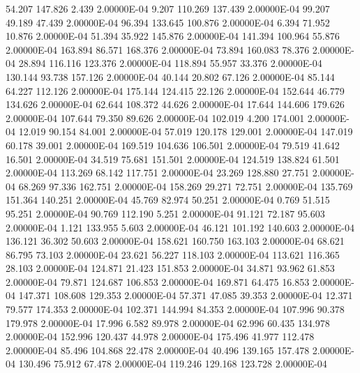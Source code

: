     54.207   147.826     2.439  2.00000E-04
     9.207   110.269   137.439  2.00000E-04
    99.207    49.189    47.439  2.00000E-04
    96.394   133.645   100.876  2.00000E-04
     6.394    71.952    10.876  2.00000E-04
    51.394    35.922   145.876  2.00000E-04
   141.394   100.964    55.876  2.00000E-04
   163.894    86.571   168.376  2.00000E-04
    73.894   160.083    78.376  2.00000E-04
    28.894   116.116   123.376  2.00000E-04
   118.894    55.957    33.376  2.00000E-04
   130.144    93.738   157.126  2.00000E-04
    40.144    20.802    67.126  2.00000E-04
    85.144    64.227   112.126  2.00000E-04
   175.144   124.415    22.126  2.00000E-04
   152.644    46.779   134.626  2.00000E-04
    62.644   108.372    44.626  2.00000E-04
    17.644   144.606   179.626  2.00000E-04
   107.644    79.350    89.626  2.00000E-04
   102.019     4.200   174.001  2.00000E-04
    12.019    90.154    84.001  2.00000E-04
    57.019   120.178   129.001  2.00000E-04
   147.019    60.178    39.001  2.00000E-04
   169.519   104.636   106.501  2.00000E-04
    79.519    41.642    16.501  2.00000E-04
    34.519    75.681   151.501  2.00000E-04
   124.519   138.824    61.501  2.00000E-04
   113.269    68.142   117.751  2.00000E-04
    23.269   128.880    27.751  2.00000E-04
    68.269    97.336   162.751  2.00000E-04
   158.269    29.271    72.751  2.00000E-04
   135.769   151.364   140.251  2.00000E-04
    45.769    82.974    50.251  2.00000E-04
     0.769    51.515    95.251  2.00000E-04
    90.769   112.190     5.251  2.00000E-04
    91.121    72.187    95.603  2.00000E-04
     1.121   133.955     5.603  2.00000E-04
    46.121   101.192   140.603  2.00000E-04
   136.121    36.302    50.603  2.00000E-04
   158.621   160.750   163.103  2.00000E-04
    68.621    86.795    73.103  2.00000E-04
    23.621    56.227   118.103  2.00000E-04
   113.621   116.365    28.103  2.00000E-04
   124.871    21.423   151.853  2.00000E-04
    34.871    93.962    61.853  2.00000E-04
    79.871   124.687   106.853  2.00000E-04
   169.871    64.475    16.853  2.00000E-04
   147.371   108.608   129.353  2.00000E-04
    57.371    47.085    39.353  2.00000E-04
    12.371    79.577   174.353  2.00000E-04
   102.371   144.994    84.353  2.00000E-04
   107.996    90.378   179.978  2.00000E-04
    17.996     6.582    89.978  2.00000E-04
    62.996    60.435   134.978  2.00000E-04
   152.996   120.437    44.978  2.00000E-04
   175.496    41.977   112.478  2.00000E-04
    85.496   104.868    22.478  2.00000E-04
    40.496   139.165   157.478  2.00000E-04
   130.496    75.912    67.478  2.00000E-04
   119.246   129.168   123.728  2.00000E-04
